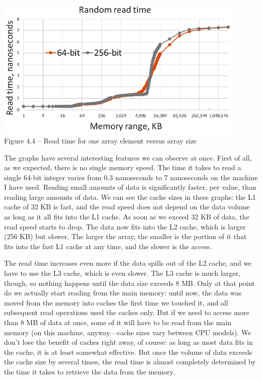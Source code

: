 \hspace*{\fill} \\ %
\begin{center}
\includegraphics[width=0.9\textwidth]{content/1/chapter4/images/4.jpg}\\
Figure 4.4 – Read time for one array element versus array size
\end{center}

The graphs have several interesting features we can observe at once. First of all, as we expected, there is no single memory speed. The time it takes to read a single 64-bit integer varies from 0.3 nanoseconds to 7 nanoseconds on the machine I have used. Reading small amounts of data is significantly faster, per value, than reading large amounts of data. We can see the cache sizes in these graphs: the L1 cache of 32 KB is fast, and the read speed does not depend on the data volume as long as it all fits into the L1 cache. As soon as we exceed 32 KB of data, the read speed starts to drop. The data now fits into the L2 cache, which is larger (256 KB) but slower. The larger the array, the smaller is the portion of it that fits into the fast L1 cache at any time, and the slower is the access.

The read time increases even more if the data spills out of the L2 cache, and we have to use the L3 cache, which is even slower. The L3 cache is much larger, though, so nothing happens until the data size exceeds 8 MB. Only at that point do we actually start reading from the main memory: until now, the data was moved from the memory into caches the first time we touched it, and all subsequent read operations used the caches only. But if we need to access more than 8 MB of data at once, some of it will have to be read from the main memory (on this machine, anyway—cache sizes vary between CPU models). We don't lose the benefit of caches right away, of course: as long as most data fits in the cache, it is at least somewhat effective. But once the volume of data exceeds the cache size by several times, the read time is almost completely determined by the time it takes to retrieve the data from the memory. 

